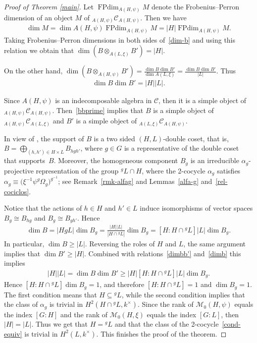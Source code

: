\documentclass[pdftex]{sigma}
\numberwithin{equation}{section}
\newcommand{\cch}{\Omega}
\newcommand{\C}{{\mathcal C}}
\newcommand{\M}{{\mathcal M}}
\newcommand{\1}{\textbf{1}}
\newcommand\FPdim{\operatorname{FPdim}}
\begin{document}
\begin{proof}[Proof of Theorem \ref{main}]
Let $\FPdim_{A(H, \psi)}M$ denote the Frobenius--Perron dimension of an object $M$ of $_{A(H, \psi)}\C_{A(H, \psi)}$. Then we have
\begin{gather*}\dim M = \dim A(H, \psi) \FPdim_{A(H, \psi)}M = |H| \FPdim_{A(H, \psi)}M.\end{gather*}
Taking Frobenius--Perron dimensions in both sides of~\eqref{dim-b} and using this relation we obtain that $\dim \left(B \otimes_{A(L, \xi)}B'\right) = |H|$.

On the other hand, $\dim (B \otimes_{A(H, \psi)}B' ) = \frac{\dim B \dim B'}{\dim{A(L, \xi)}} = \frac{\dim B \dim B'}{|L|}$. Thus
\begin{gather}\label{dimbb'} \dim B \dim B' = |H| |L|. \end{gather}

Since $A(H, \psi)$ is an indecomposable algebra in $\C$, then it is a simple object of $_{A(H, \psi)}\C_{A(H, \psi)}$. Then~\eqref{bbprime} implies that $B$ is a simple object of $_{A(H, \psi)}\C_{A(L, \xi)}$ and $B'$ is a simple object of $_{A(L, \xi)}\C_{A(H, \psi)}$.

In view of \cite[Proposition~3.2]{ostrik}, the support of $B$ is a two sided $(H, L)$-double coset, that is, $B = \bigoplus_{(h,h') \in H \times L} B_{hgh'}$, where $g \in G$ is a representative of the double coset that supports~$B$. Moreover, the homogeneous component $B_g$ is an irreducible $\alpha_g$-projective representation of the group $^gL \cap H$, where the 2-cocycle $\alpha_g$ satisf\/ies~$\alpha_g \equiv \big(\xi^{-1}\psi^g \cch_g\big)^{g^{-1}}$; see Remark~\ref{rmk-alfag} and Lemmas~\ref{alfa-g} and~\ref{rel-cociclos}.

Notice that the actions of $h \in H$ and $h'\in L$ induce isomorphisms of vector spaces $B_{g} \cong B_{hg}$ and $B_{g} \cong B_{gh'}$. Hence
\begin{gather}\label{dimb}\dim B = |HgL| \dim B_g = \frac{|H| |L|}{|H \cap {} ^gL|} \dim B_g = [H: H \cap {}^gL] |L| \dim B_g.\end{gather}
In particular, $\dim B \geq |L|$. Reversing the roles of $H$ and $L$, the same argument implies that $\dim B' \geq |H|$. Combined with relations~\eqref{dimbb'} and~\eqref{dimb} this implies
\begin{gather*}|H| |L| = \dim B \dim B' \geq |H| [H : H \cap {}^gL] |L| \dim B_g.\end{gather*}
Hence $[H\colon H \cap {}^gL] \dim B_g = 1$, and therefore $[H\colon H \cap {}^gL] = 1$ and $\dim B_g = 1$. The f\/irst condition means that $H \subseteq {}^gL$, while the second condition implies that the class of $\alpha_g$ is trivial in $H^2(H \cap {}^gL, k^\times)$. Since the rank of $\M_0(H, \psi)$ equals the index $[G:H]$ and the rank of $\M_0(H, \xi)$ equals the index $[G:L]$, then $|H| = |L|$. Thus we get that $H = {}^gL$ and that the class of the 2-cocycle~\eqref{cond-equiv} is trivial in $H^2(L, k^\times)$. This f\/inishes the proof of the theorem.
 \end{proof}
\end{document}
